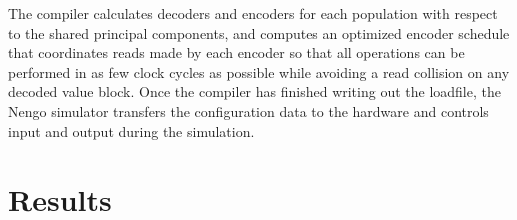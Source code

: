 \documentclass[english]{article}
\begin{document}
The compiler calculates decoders and encoders for each population with respect
to the shared principal components, and computes an optimized encoder schedule %
that coordinates reads made by each encoder so that all operations can be performed
in as few clock cycles as possible while avoiding a read collision on any decoded value block.
Once the compiler has finished writing out the loadfile, the Nengo simulator
transfers the configuration data to the hardware and controls input and output during the simulation.


\section{Results}




\end{document}
